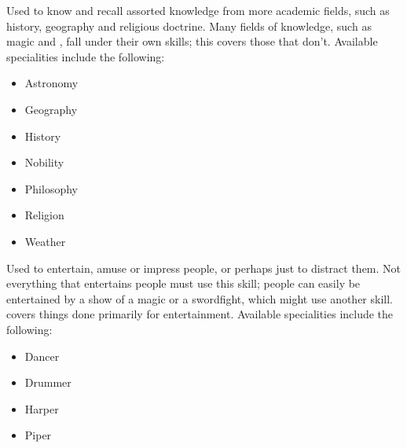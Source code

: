 
Used to know and recall assorted knowledge from more academic fields, such as history, geography and religious doctrine. %
Many fields of knowledge, such as magic and , fall under their own skills; this covers those that don't.
Available specialities include the following:

\begin{itemize}
	\item Astronomy
	\item Geography
	\item History
	\item Nobility
	\item Philosophy
	\item Religion %
	\item Weather
\end{itemize}


Used to entertain, amuse or impress people, or perhaps just to distract them.
Not everything that entertains people must use this skill; people can easily be entertained by a show of a magic or a swordfight, which might use another skill.
 covers things done primarily for entertainment.
Available specialities include the following:

\begin{itemize}
	\item Dancer
	\item Drummer
	\item Harper
	\item Piper
\end{itemize}
